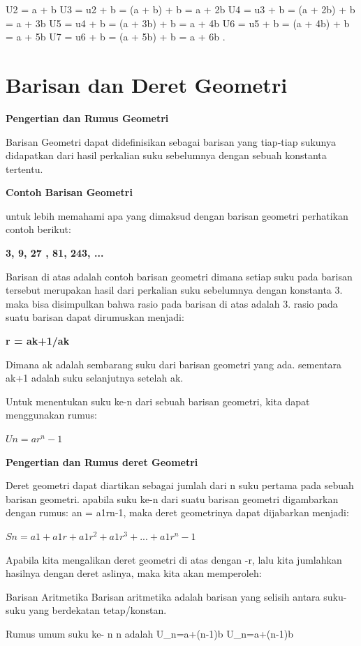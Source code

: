 \documentclass[11pt,fleqn]{book} %
\begin{document}
U2 = a + b
U3 = u2 + b = (a + b) + b = a + 2b
U4 = u3 + b = (a + 2b) + b = a + 3b
U5 = u4 + b = (a + 3b) + b = a + 4b
U6 = u5 + b = (a + 4b) + b = a + 5b
U7 = u6 + b = (a + 5b) + b = a + 6b
.
\section{Barisan dan Deret Geometri}
\textbf{Pengertian dan Rumus Geometri}

Barisan Geometri dapat didefinisikan sebagai barisan yang tiap-tiap sukunya didapatkan dari hasil perkalian suku sebelumnya dengan sebuah konstanta tertentu.

\textbf{Contoh Barisan Geometri}

 untuk lebih memahami apa yang dimaksud dengan barisan geometri perhatikan contoh berikut:
 
\textbf{3, 9, 27 , 81, 243, ...}

Barisan di atas adalah contoh barisan geometri dimana setiap suku pada barisan tersebut merupakan hasil dari perkalian suku sebelumnya dengan konstanta 3. maka bisa disimpulkan bahwa rasio pada barisan di atas adalah 3. rasio pada suatu barisan dapat dirumuskan menjadi:

\textbf{r = ak+1/ak}

Dimana ak adalah sembarang suku dari barisan geometri yang ada. sementara ak+1 adalah suku selanjutnya setelah ak.

Untuk menentukan suku ke-n dari sebuah barisan geometri, kita dapat menggunakan rumus:

\textbf{$Un = ar^n-1$}

\textbf{ Pengertian dan Rumus deret Geometri}

Deret geometri dapat diartikan sebagai jumlah dari n suku pertama pada sebuah barisan geometri. apabila suku ke-n dari suatu barisan geometri digambarkan dengan rumus: an = a1rn-1, maka deret geometrinya dapat dijabarkan menjadi:

\textbf{$Sn = a1 + a1r + a1r^2 + a1r^3 + ... + a1r^n-1$}

Apabila kita mengalikan deret geometri di atas dengan -r, lalu kita jumlahkan hasilnya dengan deret aslinya, maka kita akan memperoleh:

Barisan Aritmetika
Barisan aritmetika adalah barisan yang selisih antara suku-suku yang berdekatan tetap/konstan.

Rumus umum suku ke- {\displaystyle n} {\displaystyle n} adalah {\displaystyle U_{n}=a+(n-1)b} {\displaystyle U_{n}=a+(n-1)b}
\end{document}
